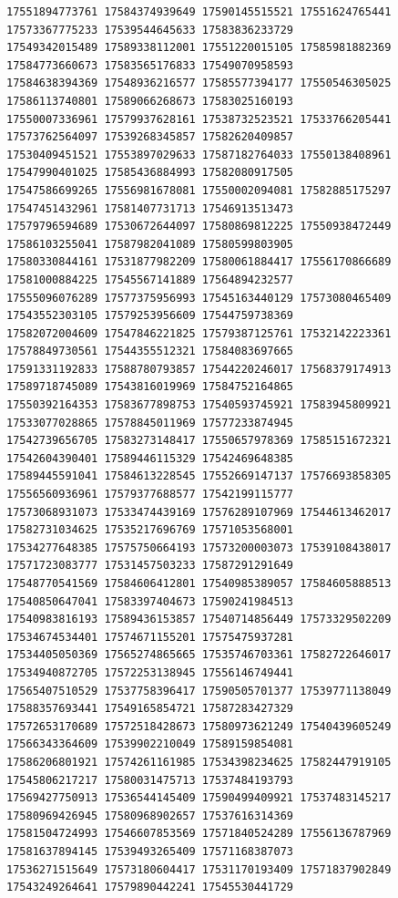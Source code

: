 \documentclass[10pt]{article}
\begin{document}
\begin{verbatim}
17551894773761 17584374939649 17590145515521 17551624765441 17573367775233 17539544645633 17583836233729
17549342015489 17589338112001 17551220015105 17585981882369 17584773660673 17583565176833 17549070958593
17584638394369 17548936216577 17585577394177 17550546305025 17586113740801 17589066268673 17583025160193
17550007336961 17579937628161 17538732523521 17533766205441 17573762564097 17539268345857 17582620409857
17530409451521 17553897029633 17587182764033 17550138408961 17547990401025 17585436884993 17582080917505
17547586699265 17556981678081 17550002094081 17582885175297 17547451432961 17581407731713 17546913513473
17579796594689 17530672644097 17580869812225 17550938472449 17586103255041 17587982041089 17580599803905
17580330844161 17531877982209 17580061884417 17556170866689 17581000884225 17545567141889 17564894232577
17555096076289 17577375956993 17545163440129 17573080465409 17543552303105 17579253956609 17544759738369
17582072004609 17547846221825 17579387125761 17532142223361 17578849730561 17544355512321 17584083697665
17591331192833 17588780793857 17544220246017 17568379174913 17589718745089 17543816019969 17584752164865
17550392164353 17583677898753 17540593745921 17583945809921 17533077028865 17578845011969 17577233874945
17542739656705 17583273148417 17550657978369 17585151672321 17542604390401 17589446115329 17542469648385
17589445591041 17584613228545 17552669147137 17576693858305 17556560936961 17579377688577 17542199115777
17573068931073 17533474439169 17576289107969 17544613462017 17582731034625 17535217696769 17571053568001
17534277648385 17575750664193 17573200003073 17539108438017 17571723083777 17531457503233 17587291291649
17548770541569 17584606412801 17540985389057 17584605888513 17540850647041 17583397404673 17590241984513
17540983816193 17589436153857 17540714856449 17573329502209 17534674534401 17574671155201 17575475937281
17534405050369 17565274865665 17535746703361 17582722646017 17534940872705 17572253138945 17556146749441
17565407510529 17537758396417 17590505701377 17539771138049 17588357693441 17549165854721 17587283427329
17572653170689 17572518428673 17580973621249 17540439605249 17566343364609 17539902210049 17589159854081
17586206801921 17574261161985 17534398234625 17582447919105 17545806217217 17580031475713 17537484193793
17569427750913 17536544145409 17590499409921 17537483145217 17580969426945 17580968902657 17537616314369
17581504724993 17546607853569 17571840524289 17556136787969 17581637894145 17539493265409 17571168387073
17536271515649 17573180604417 17531170193409 17571837902849 17543249264641 17579890442241 17545530441729

\end{verbatim}
\end{document}
